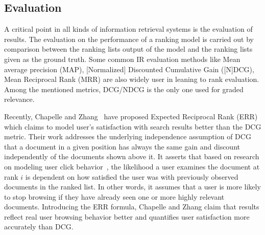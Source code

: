 \subsection{Evaluation}

A critical point in all kinds of information retrieval systems is the evaluation of results. The evaluation on the performance of a ranking model is carried out by comparison between the ranking lists output of the model and the ranking lists given as the ground truth. Some common IR evaluation methods like Mean average precision (MAP), [Normalized] Discounted Cumulative Gain ([N]DCG), Mean Reciprocal Rank (MRR) are also widely user in leaning to rank evaluation. Among the mentioned metrics, DCG/NDCG is the only one used for graded relevance.

Recently, Chapelle and Zhang~\cite{l2r-err} have proposed Expected Reciprocal Rank (ERR) which claims to model user's satisfaction with search results better than the DCG metric. Their work addresses the underlying independence assumption of DCG that a document in a given position has always the same gain and discount independently of the documents shown above it. It asserts that based on research on modeling user click behavior~\cite{l2r-clickmodel1,l2r-clickmodel2}, the likelihood a user examines the document at rank $i$ is dependent on how satisfied the user was with previously observed documents in the ranked list. In other words, it assumes that a user is more likely to stop browsing if they have already seen one or more highly relevant documents. Introducing the ERR formula, Chapelle and Zhang claim that results reflect real user browsing behavior better and quantifies user satisfaction more accurately than DCG.
